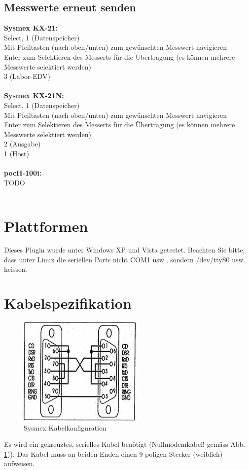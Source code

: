 \documentclass[a4paper]{scrartcl}
\begin{document}
\subsection{Messwerte erneut senden}
\textbf{Sysmex KX-21:}\\
Select, 1 (Datenspeicher)\\
Mit Pfeiltasten (nach oben/unten) zum gew\"unschten Messwert navigieren\\
Enter zum Selektieren des Messerts f\"ur die \"Ubertragung (es k\"onnen mehrere Messwerte selektiert werden)\\
3 (Labor-EDV)\\
\\
\textbf{Sysmex KX-21N:}\\
Select, 1 (Datenspeicher)\\
Mit Pfeiltasten (nach oben/unten) zum gew\"unschten Messwert navigieren\\
Enter zum Selektieren des Messerts f\"ur die \"Ubertragung (es k\"onnen mehrere Messwerte selektiert werden)\\
2 (Ausgabe)\\
1 (Host)\\
\\
\textbf{pocH-100i:}\\
TODO\\
\\
\section{Plattformen}
Dieses Plugin wurde unter Windows XP und Vista getestet. Beachten Sie bitte, dass unter Linux die seriellen Ports nicht COM1 usw., sondern /dev/ttyS0 usw. heissen.
\section{Kabelspezifikation}
\begin{figure}[h]
    \centering
    \includegraphics{kabel}
    \caption{Sysmex Kabelkonfiguration}
    \label{fig:kabel}
\end{figure}
Es wird ein gekreuztes, serielles Kabel ben\"otigt (Nullmodemkabel! gem\"ass Abb. \ref{fig:kabel})). Das Kabel muss an beiden Enden einen 9-poligen Stecker (weiblich) aufweisen.
\end{document}
